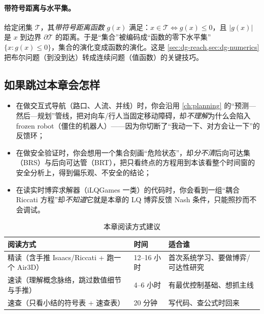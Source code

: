 \paragraph{带符号距离与水平集。}
给定闭集 $\mathcal{T}$，其\emph{带符号距离函数} $g(x)$ 满足：$x\in\mathcal{T}\Leftrightarrow g(x)\le 0$，且 $|g(x)|$ 是 $x$ 到边界 $\partial\mathcal{T}$ 的距离。于是“集合”被编码成“函数的零下水平集” $\{x:g(x)\le 0\}$，集合的演化变成函数的演化。这是 \cref{sec:dg-reach,sec:dg-numerics} 把布尔问题（到没到达）转成连续问题（值函数）的关键技巧。

\subsection*{如果跳过本章会怎样}
\begin{itemize}
  \item 在做交互式导航（路口、人流、并线）时，你会沿用 \cref{ch:planning} 的“预测—然后—规划”管线，把对向车/行人当固定移动障碍，却\emph{不理解}为什么会陷入 frozen robot（僵住的机器人）——因为你切断了“我动一下、对方会让一下”的反馈环；
  \item 在做安全验证时，你会想用一个集合刻画“危险状态”，却\emph{分不清}后向可达集（BRS）与后向可达管（BRT），把只看终点的方程用到本该看整个时间窗的安全分析上，得到偏乐观、不安全的结论；
  \item 在读实时博弈求解器（iLQGames 一类）的代码时，你会看到一组“耦合 Riccati 方程”却\emph{不知道}它就是本章的 LQ 博弈反馈 Nash 条件，只能照抄而不会调试。
\end{itemize}

\begin{table}[H]\centering\small
\caption{本章阅读方式建议}
\label{tab:dg-reading}
\begin{tabular}{lll}
\toprule
阅读方式 & 时间 & 适合谁 \\
\midrule
精读（含手推 Isaacs/Riccati + 跑一个 Air3D） & 12--16 小时 & 首次系统学习、要做博弈/可达性研究 \\
速读（理解概念脉络，跳过数值细节与手推） & 4--6 小时 & 有最优控制基础、想抓主线 \\
速查（只看小结的符号表 + 速查表） & 20 分钟 & 写代码、查公式时回来 \\
\bottomrule
\end{tabular}
\end{table}

